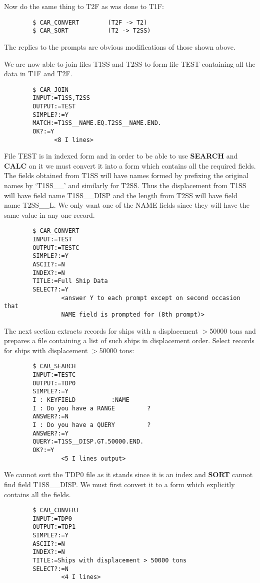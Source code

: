 Now do the same thing to T2F as was done to T1F:
\begin{verbatim}
        $ CAR_CONVERT        (T2F -> T2)
        $ CAR_SORT           (T2 -> T2SS)
\end{verbatim}
The replies to the prompts are obvious modifications of those shown above.

We are now able to join files T1SS and T2SS to form file TEST containing
all the data in T1F and T2F.
\begin{verbatim}
        $ CAR_JOIN
        INPUT:=T1SS,T2SS
        OUTPUT:=TEST
        SIMPLE?:=Y
        MATCH:=T1SS__NAME.EQ.T2SS__NAME.END.
        OK?:=Y
              <8 I lines>
\end{verbatim}
File TEST is in indexed form and in order to be able to use {\bf SEARCH}
and {\bf CALC} on it we must convert it into a form which contains all the
required fields.
The fields obtained from T1SS will have names formed by prefixing the
original names by `T1SS\_\_' and similarly for T2SS.
Thus the displacement from T1SS will have field name T1SS\_\_DISP and the length
from T2SS will have field name T2SS\_\_L.
We only want one of the NAME fields since they will have the same value in any
one record.
\begin{verbatim}
        $ CAR_CONVERT
        INPUT:=TEST
        OUTPUT:=TESTC
        SIMPLE?:=Y
        ASCII?:=N
        INDEX?:=N
        TITLE:=Full Ship Data
        SELECT?:=Y
                <answer Y to each prompt except on second occasion that
                NAME field is prompted for (8th prompt)>
\end{verbatim}
The next section extracts records for ships with a displacement $>$50000 tons and
prepares a file containing a list of such ships in displacement order.
Select records for ships with displacement $>$50000 tons:
\begin{verbatim}
        $ CAR_SEARCH
        INPUT:=TESTC
        OUTPUT:=TDP0
        SIMPLE?:=Y
        I : KEYFIELD          :NAME
        I : Do you have a RANGE         ?
        ANSWER?:=N
        I : Do you have a QUERY         ?
        ANSWER?:=Y
        QUERY:=T1SS__DISP.GT.50000.END.
        OK?:=Y
                <5 I lines output>
\end{verbatim}
We cannot sort the TDP0 file as it stands since it is an index and {\bf SORT}
cannot find field T1SS\_\_DISP.
We must first convert it to a form which explicitly contains all the fields.
\begin{verbatim}
        $ CAR_CONVERT
        INPUT:=TDP0
        OUTPUT:=TDP1
        SIMPLE?:=Y
        ASCII?:=N
        INDEX?:=N
        TITLE:=Ships with displacement > 50000 tons
        SELECT?:=N
                <4 I lines>
\end{verbatim}
